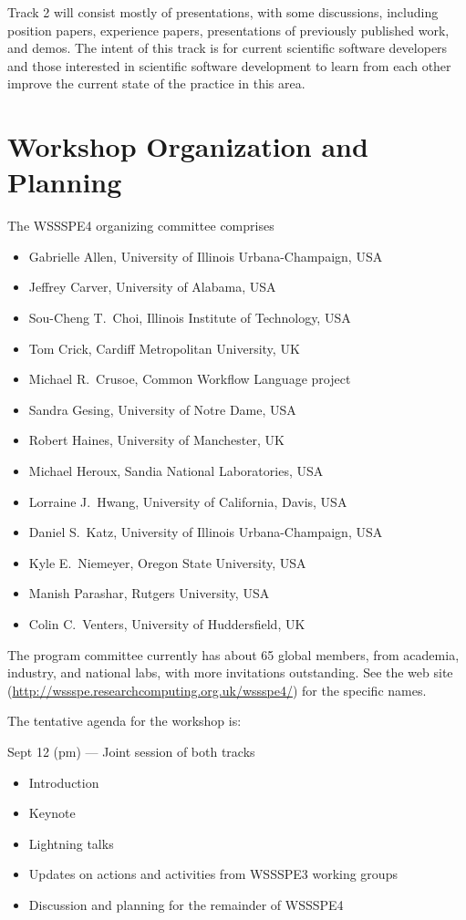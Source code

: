 \documentclass[11pt]{article}
\newenvironment{shortlist}{
        \vspace*{-0.8em}
  \begin{itemize}
  \setlength{\itemsep}{-0.3em}
}{
  \end{itemize}
        \vspace*{-0.6em}
}
\begin{document}
Track 2 will consist mostly of presentations, with some discussions, including position papers, experience papers, presentations of previously published work, and demos.  The intent of this
track is for current scientific software developers and those interested in scientific software development to learn from each other improve the current state of the practice in this area.


\section{Workshop Organization and Planning}

The WSSSPE4 organizing committee comprises 
\begin{shortlist}
\item Gabrielle Allen, University of Illinois Urbana-Champaign, USA
\item Jeffrey Carver, University of Alabama, USA
\item Sou-Cheng T.~Choi, Illinois Institute of Technology, USA
\item Tom Crick, Cardiff Metropolitan University, UK
\item Michael R.~Crusoe, Common Workflow Language project
\item Sandra Gesing, University of Notre Dame, USA
\item Robert Haines, University of Manchester, UK
\item Michael Heroux, Sandia National Laboratories, USA
\item Lorraine J.~Hwang, University of California, Davis, USA
\item Daniel S.~Katz, University of Illinois Urbana-Champaign, USA
\item Kyle E.~Niemeyer, Oregon State University, USA
\item Manish Parashar, Rutgers University, USA
\item Colin C.~Venters, University of Huddersfield, UK
\end{shortlist}

The program committee currently has about 65 global members, from academia, industry, and national labs, with more invitations outstanding.  See the web site (\url{http://wssspe.researchcomputing.org.uk/wssspe4/}) for the specific names.


The tentative agenda for the workshop is:

Sept 12 (pm) --- Joint session of both tracks

\begin{shortlist}
\item Introduction
\item Keynote
\item Lightning talks
\item Updates on actions and activities from WSSSPE3 working groups
\item Discussion and planning for the remainder of WSSSPE4
\end{shortlist}
\end{document}

